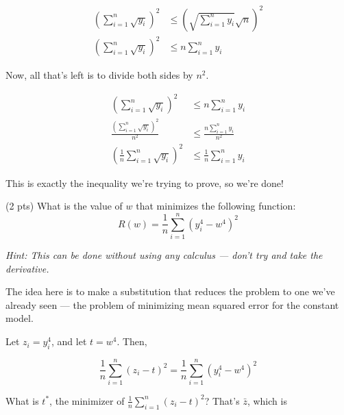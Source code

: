 \documentclass[11pt]{article}
\begin{document}
\begin{prob}[(20 pts)]
\begin{subprob}
\begin{solution}
\begin{align*}
  \left( \sum_{i=1}^n \sqrt{y_i} \right)^2 &\leq \left( \sqrt{\sum_{i=1}^n y_i} \sqrt{n} \right)^2 \\
  \left( \sum_{i=1}^n \sqrt{y_i} \right)^2 & \leq n\sum_{i=1}^n y_i
\end{align*}

Now, all that's left is to divide both sides by $n^2$.

\begin{align*}
    \left( \sum_{i=1}^n \sqrt{y_i} \right)^2 & \leq n\sum_{i=1}^n y_i \\
  \frac{\left( \sum_{i=1}^n \sqrt{y_i} \right)^2}{n^2} & \leq \frac{n\sum_{i=1}^n y_i}{n^2} \\
  \left( \frac{1}{n} \sum_{i=1}^n \sqrt{y_i} \right)^2 & \leq \frac{1}{n} \sum_{i=1}^n y_i
\end{align*}

This is exactly the inequality we're trying to prove, so we're done!

\end{solution}

\end{subprob}

\begin{subprob}(2 pts) What is the value of $w$ that minimizes the following function: $$R(w) = \frac{1}{n}\sum_{i=1}^n (y_i^4 - w^4)^2$$

\textit{Hint: This can be done without using any calculus --- don't try and take the derivative.}

     

\begin{solution}

The idea here is to make a substitution that reduces the problem to one we've already seen --- the problem of minimizing mean squared error for the constant model.

Let $z_i = y_i^4$, and let $t = w^4$. Then,

$$\frac{1}{n}\sum_{i=1}^n (z_i - t)^2 = \frac{1}{n}\sum_{i=1}^n (y_i^4 - w^4)^2$$

What is $t^*$, the minimizer of $\frac{1}{n}\sum_{i=1}^n (z_i - t)^2$? That's $\bar{z}$, which is


\end{solution}
\end{subprob}
\end{prob}
\end{document}

